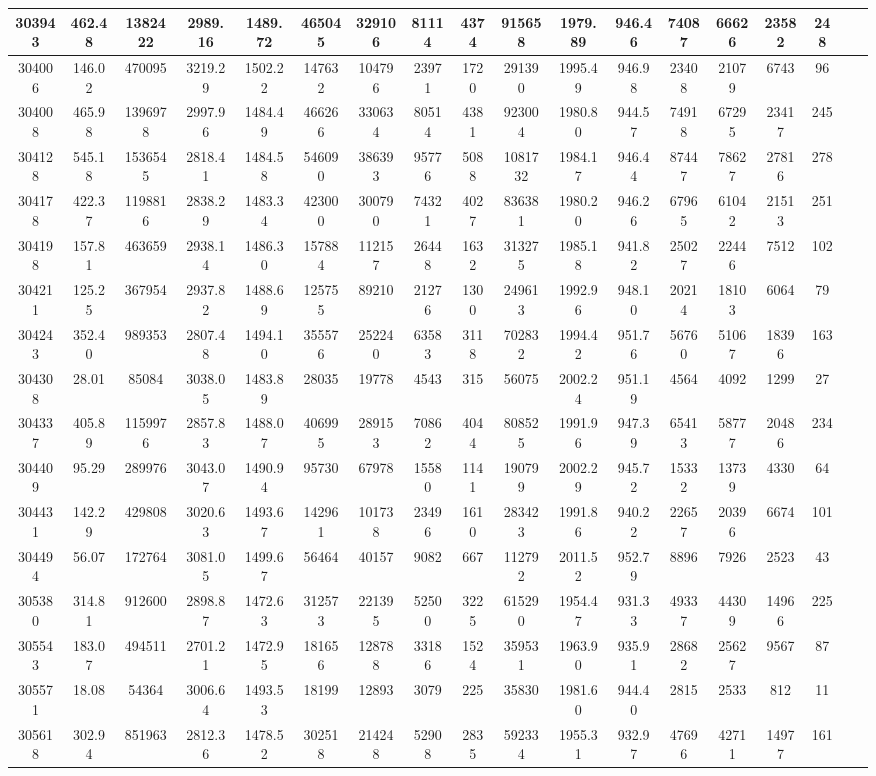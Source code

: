 \documentclass[10pt]{extarticle}
\begin{document}
\begin{longtable}{|c|c|c|c|c|c|c|c|c|c|c|c|c|c|c|c|c|c|}
\hline 
303943&462.48&1382422&2989.16&1489.72&465045&329106&81114&4374&915658&1979.89&946.46&74087&66626&23582&248 \\ 
\hline 
304006&146.02&470095&3219.29&1502.22&147632&104796&23971&1720&291390&1995.49&946.98&23408&21079&6743&96 \\ 
\hline 
304008&465.98&1396978&2997.96&1484.49&466266&330634&80514&4381&923004&1980.80&944.57&74918&67295&23417&245 \\ 
\hline 
304128&545.18&1536545&2818.41&1484.58&546090&386393&95776&5088&1081732&1984.17&946.44&87447&78627&27816&278 \\ 
\hline 
304178&422.37&1198816&2838.29&1483.34&423000&300790&74321&4027&836381&1980.20&946.26&67965&61042&21513&251 \\ 
\hline 
304198&157.81&463659&2938.14&1486.30&157884&112157&26448&1632&313275&1985.18&941.82&25027&22446&7512&102 \\ 
\hline 
304211&125.25&367954&2937.82&1488.69&125755&89210&21276&1300&249613&1992.96&948.10&20214&18103&6064&79 \\ 
\hline 
304243&352.40&989353&2807.48&1494.10&355576&252240&63583&3118&702832&1994.42&951.76&56760&51067&18396&163 \\ 
\hline 
304308&28.01&85084&3038.05&1483.89&28035&19778&4543&315&56075&2002.24&951.19&4564&4092&1299&27 \\ 
\hline 
304337&405.89&1159976&2857.83&1488.07&406995&289153&70862&4044&808525&1991.96&947.39&65413&58777&20486&234 \\ 
\hline 
304409&95.29&289976&3043.07&1490.94&95730&67978&15580&1141&190799&2002.29&945.72&15332&13739&4330&64 \\ 
\hline 
304431&142.29&429808&3020.63&1493.67&142961&101738&23496&1610&283423&1991.86&940.22&22657&20396&6674&101 \\ 
\hline 
304494&56.07&172764&3081.05&1499.67&56464&40157&9082&667&112792&2011.52&952.79&8896&7926&2523&43 \\ 
\hline 
305380&314.81&912600&2898.87&1472.63&312573&221395&52500&3225&615290&1954.47&931.33&49337&44309&14966&225 \\ 
\hline 
305543&183.07&494511&2701.21&1472.95&181656&128788&33186&1524&359531&1963.90&935.91&28682&25627&9567&87 \\ 
\hline 
305571&18.08&54364&3006.64&1493.53&18199&12893&3079&225&35830&1981.60&944.40&2815&2533&812&11 \\ 
\hline 
305618&302.94&851963&2812.36&1478.52&302518&214248&52908&2835&592334&1955.31&932.97&47696&42711&14977&161 \\ 

\end{longtable}
\end{document}

